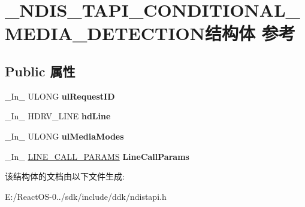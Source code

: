 \hypertarget{struct___n_d_i_s___t_a_p_i___c_o_n_d_i_t_i_o_n_a_l___m_e_d_i_a___d_e_t_e_c_t_i_o_n}{}\section{\+\_\+\+N\+D\+I\+S\+\_\+\+T\+A\+P\+I\+\_\+\+C\+O\+N\+D\+I\+T\+I\+O\+N\+A\+L\+\_\+\+M\+E\+D\+I\+A\+\_\+\+D\+E\+T\+E\+C\+T\+I\+O\+N结构体 参考}
\label{struct___n_d_i_s___t_a_p_i___c_o_n_d_i_t_i_o_n_a_l___m_e_d_i_a___d_e_t_e_c_t_i_o_n}
\subsection*{Public 属性}
\begin{DoxyCompactItemize}
\item 
\mbox{\label{struct___n_d_i_s___t_a_p_i___c_o_n_d_i_t_i_o_n_a_l___m_e_d_i_a___d_e_t_e_c_t_i_o_n_a96bb56636972cfd07996933d0e4b29fe}} 
\+\_\+\+In\+\_\+ U\+L\+O\+NG {\bfseries ul\+Request\+ID}
\item 
\mbox{\label{struct___n_d_i_s___t_a_p_i___c_o_n_d_i_t_i_o_n_a_l___m_e_d_i_a___d_e_t_e_c_t_i_o_n_ab3b86e689957c8b1ffbd9bb5dde572b5}} 
\+\_\+\+In\+\_\+ H\+D\+R\+V\+\_\+\+L\+I\+NE {\bfseries hd\+Line}
\item 
\mbox{\label{struct___n_d_i_s___t_a_p_i___c_o_n_d_i_t_i_o_n_a_l___m_e_d_i_a___d_e_t_e_c_t_i_o_n_a44b6920f2a6e827370d70e2d1d37ea2b}} 
\+\_\+\+In\+\_\+ U\+L\+O\+NG {\bfseries ul\+Media\+Modes}
\item 
\mbox{\label{struct___n_d_i_s___t_a_p_i___c_o_n_d_i_t_i_o_n_a_l___m_e_d_i_a___d_e_t_e_c_t_i_o_n_a3e477ae4845b45151ec5d8852ab1c7a7}} 
\+\_\+\+In\+\_\+ \hyperlink{struct___l_i_n_e___c_a_l_l___p_a_r_a_m_s}{L\+I\+N\+E\+\_\+\+C\+A\+L\+L\+\_\+\+P\+A\+R\+A\+MS} {\bfseries Line\+Call\+Params}
\end{DoxyCompactItemize}


该结构体的文档由以下文件生成\+:\begin{DoxyCompactItemize}
\item 
E\+:/\+React\+O\+S-\/0../sdk/include/ddk/ndistapi.\+h\end{DoxyCompactItemize}
